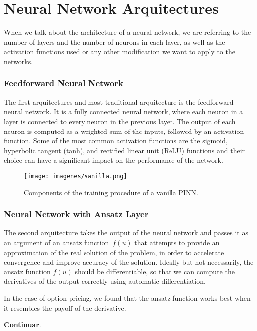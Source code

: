 \documentclass[12pt]{report} %
\theoremstyle{plain}           %
\theoremstyle{definition}      %
\theoremstyle{remark}          %
\begin{document}
\section{Neural Network Arquitectures}

When we talk about the architecture of a neural network, we are referring to the number of 
layers and the number of neurons in each layer, as well as the activation functions used or 
any other modification we want to apply to the networks.

\subsubsection{Feedforward Neural Network}

The first arquitectures and most traditional arquitecture is the feedforward neural network. It is a
fully connected neural network, where each neuron in a layer is connected to every neuron in the
previous layer. The output of each neuron is computed as a weighted sum of the inputs, followed by
an activation function. Some of the most common activation functions are the sigmoid, hyperbolic tangent (tanh),
and rectified linear unit (ReLU) functions and their choice can have a significant impact on the performance of the network.


\begin{figure}[H]
	\centering
	\texttt{[image: imagenes/vanilla.png]}
	\caption{Components of the training procedure of a vanilla PINN.}
	\label{fig:vanilla_pinn}
\end{figure}

\subsubsection{Neural Network with Ansatz Layer}

The second arquitecture takes the output of the neural network and passes it as an argument of an ansatz 
function $f(u)$ that attempts to provide an approximation of the real solution of the problem, 
in order to accelerate convergence and improve accuracy of the solution. Ideally but not necessarily, 
the ansatz function $f(u)$ should be differentiable, so that we can compute the derivatives of the output correctly 
using automatic differentiation.

In the case of option pricing, we found that the ansatz function works best when it resembles the payoff of the derivative.

\textbf{Continuar}.
\end{document}
